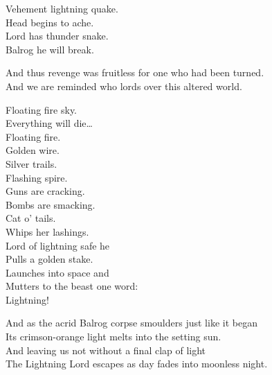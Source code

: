 Vehement lightning quake. \\
Head begins to ache. \\
Lord has thunder snake. \\
Balrog he will break. \\


And thus revenge was fruitless for one who had been turned. \\
And we are reminded who lords over this altered world. \\


Floating fire sky. \\
Everything will die… \\

Floating fire. \\
Golden wire. \\
Silver trails. \\
Flashing spire. \\

Guns are cracking. \\
Bombs are smacking. \\
Cat o' tails. \\
Whips her lashings. \\

Lord of lightning safe he \\
Pulls a golden stake. \\
Launches into space and \\
Mutters to the beast one word: \\

Lightning! \\





And as the acrid Balrog corpse smoulders just like it began \\
Its crimson-orange light melts into the setting sun. \\

And leaving us not without a final clap of light \\
The Lightning Lord escapes as day fades into moonless night. \\


